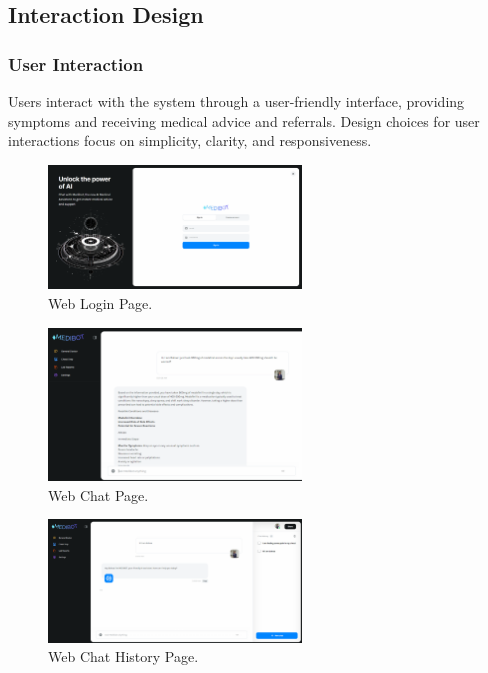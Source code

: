 \subsection{Interaction Design}

\subsubsection{User Interaction}
Users interact with the system through a user-friendly interface, providing symptoms and receiving medical advice and referrals. Design choices for user interactions focus on simplicity, clarity, and responsiveness.

\begin{figure}[H]
    \centering
    \includegraphics[width=0.6\textwidth]{./Figures/web-login.png}
    \caption{Web Login Page.}
    \label{fig:web-login}
\end{figure}
  
\begin{figure}[H]
    \centering
    \includegraphics[width=0.6\textwidth]{./Figures/web-chat.png}
    \caption{Web Chat Page.}
    \label{fig:web-chat}
\end{figure}

\begin{figure}[H]
    \centering
    \includegraphics[width=0.6\textwidth]{./Figures/web-chat-history.png}
    \caption{Web Chat History Page.}
    \label{fig:web-chat-history}
\end{figure}

